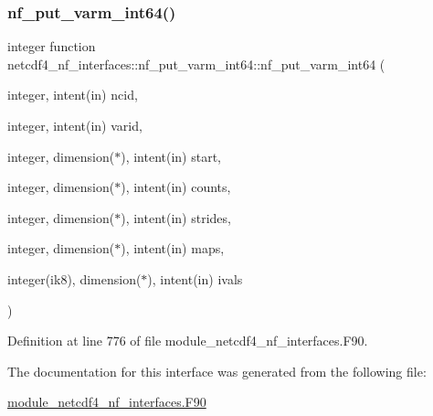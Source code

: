 \subsubsection{\texorpdfstring{nf\+\_\+put\+\_\+varm\+\_\+int64()}{nf\_put\_varm\_int64()}}
{\footnotesize\ttfamily integer function netcdf4\+\_\+nf\+\_\+interfaces\+::nf\+\_\+put\+\_\+varm\+\_\+int64\+::nf\+\_\+put\+\_\+varm\+\_\+int64 (\begin{DoxyParamCaption}\item[{integer, intent(in)}]{ncid,  }\item[{integer, intent(in)}]{varid,  }\item[{integer, dimension($\ast$), intent(in)}]{start,  }\item[{integer, dimension($\ast$), intent(in)}]{counts,  }\item[{integer, dimension($\ast$), intent(in)}]{strides,  }\item[{integer, dimension($\ast$), intent(in)}]{maps,  }\item[{integer(ik8), dimension($\ast$), intent(in)}]{ivals }\end{DoxyParamCaption})}



Definition at line 776 of file module\+\_\+netcdf4\+\_\+nf\+\_\+interfaces.\+F90.



The documentation for this interface was generated from the following file\+:\begin{DoxyCompactItemize}
\item 
\hyperlink{module__netcdf4__nf__interfaces_8F90}{module\+\_\+netcdf4\+\_\+nf\+\_\+interfaces.\+F90}\end{DoxyCompactItemize}

